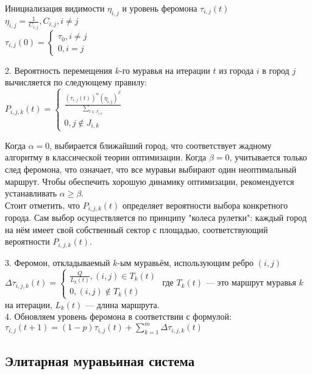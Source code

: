 \documentclass[14pt]{article}
\begin{document}
Инициализация видимости $\eta_{i,j}$ и уровень феромона $\tau_{i,j} (t)$\\
$\eta_{i,j}=\frac{1}{C_{i,j}}, C_{i,j}, i \neq j$\\
$\tau_{i,j} (0)= \begin{cases}
    \tau_0, i \neq j\\
    0, i=j
\end{cases}$

2. Вероятность перемещения $k$-го муравья на итерации $t$ из города $i$ в город $j$ вычисляется по следующему правилу:\\

$P_{i,j,k}(t)=\begin{cases}
    \frac{(\tau_{i,j}(t))^\alpha(\eta_{i,j})^\beta}{\sum_{l \in J_{i,k}}}\\
    0, j \notin J_{i,k}
\end{cases}$

Когда $\alpha=0$, выбирается ближайший город, что соответствует жадному алгоритму в классической теории оптимизации. Когда $\beta=0$, учитывается только след феромона, что означает, что все муравьи выбирают один неоптимальный маршрут. Чтобы обеспечить хорошую динамику оптимизации, рекомендуется устанавливать $\alpha \ge \beta$.\\

Стоит отметить, что $P_{i,j,k}(t)$ определяет вероятности выбора конкретного города. Сам выбор осуществляется по принципу "колеса рулетки": каждый город на нём имеет свой собственный сектор с площадью, соответствующий вероятности $P_{i,j,k}(t)$.

3. Феромон, откладываемый $k$-ым муравьём, использующим ребро $(i,j)$\\

$\Delta\tau_{i,j,k}(t)=\begin{cases}
    \frac{Q}{L_k(t)}, (i,j) \in T_k(t)\\
    0, (i,j) \notin T_k(t)
\end{cases}$ 
где $T_k(t)$ --- это маршрут муравья $k$ на итерации, $L_k(t)$ --- длина маршрута.\\

4. Обновляем уровень феромона в соответствии с формулой:\\

$\tau_{i,j}(t+1)=(1-p)\tau_{i,j}(t)+\sum_{k=1}^m \Delta\tau_{i,j,k}(t)$

\subsection{Элитарная муравьиная система}
\end{document}

